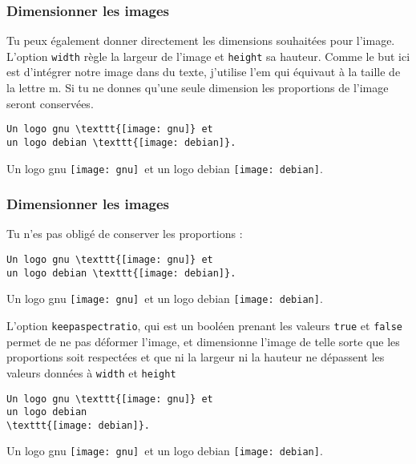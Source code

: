 \documentclass[10pt,hyperref={pdfpagemode=FullScreen},xcolor=dvipsnames,xcolor=table, xcolor=svgnames]{beamer}%
\begin{document}
 \begin{frame}[fragile]
   \frametitle{Dimensionner les images}
Tu peux également donner directement les dimensions souhaitées pour l'image. L'option {\color{blue}\verb!width!} règle la largeur de l'image et {\color{blue}\verb!height!} sa hauteur. Comme le but ici est d'intégrer notre image dans du texte, j'utilise l'em qui équivaut à la taille de la lettre m. Si tu ne donnes qu'une seule dimension les proportions de l'image seront conservées.
\begin{exampleblock}{}
\begin{verbatim}
Un logo gnu \texttt{[image: gnu]} et
un logo debian \texttt{[image: debian]}.
\end{verbatim}
\end{exampleblock}
\begin{block}{}
Un logo gnu \texttt{[image: gnu]}\, et un logo debian \texttt{[image: debian]}.
\end{block}
\end{frame}
 \begin{frame}[fragile]
   \frametitle{Dimensionner les images}
Tu n'es pas obligé de conserver les proportions :
\begin{exampleblock}{}
\begin{verbatim}
Un logo gnu \texttt{[image: gnu]} et
un logo debian \texttt{[image: debian]}.
\end{verbatim}
\end{exampleblock}
\begin{block}{}
Un logo gnu \texttt{[image: gnu]}\, et un logo debian \texttt{[image: debian]}.
\end{block}
L'option {\color{blue}\verb!keepaspectratio!}, qui est un booléen prenant les valeurs {\color{blue}\verb!true!} et  {\color{blue}\verb!false!} permet de ne pas déformer l'image, et dimensionne l'image de telle sorte que les proportions soit respectées et que ni la largeur ni la hauteur ne dépassent les valeurs données à {\color{blue}\verb!width!} et {\color{blue}\verb!height!}
\begin{exampleblock}{}
\footnotesize
\begin{verbatim}
Un logo gnu \texttt{[image: gnu]} et
un logo debian
\texttt{[image: debian]}.
\end{verbatim}
\end{exampleblock}
\begin{block}{}
Un logo gnu \texttt{[image: gnu]}\, et un logo debian \texttt{[image: debian]}.
\end{block}
\end{frame}
\end{document}
